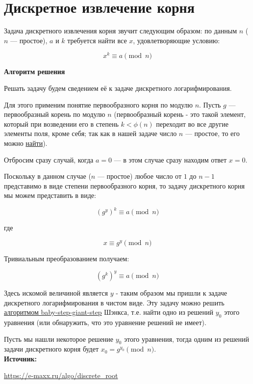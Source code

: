 \documentclass[12pt,a4paper]{scrartcl}
\begin{document}
	
\section{Дискретное извлечение корня}

Задача дискретного извлечения корня звучит следующим образом: по данным $n$ ($n$ — простое), $a$ и $k$ требуется найти все $x$, удовлетворяющие условию:

$$x^k \equiv a \pmod{n}$$

\textbf{Алгоритм решения}

Решать задачу будем сведением её к задаче дискретного логарифмирования.

Для этого применим понятие первообразного корня по модулю $n$. Пусть $g$ — первообразный корень по модулю $n$ (первообразный корень - это такой элемент, который при возведении его в степень $k < \phi(n)$ переходит во все другие элементы поля, кроме себя; так как в нашей задаче число $n$ — простое, то его можно \href{https://yatb.kksctf.ru/}{найти}).

Отбросим сразу случай, когда $a=0$ — в этом случае сразу находим ответ $x=0$.

Поскольку в данном случае ($n$ — простое) любое число от $1$ до $n-1$ представимо в виде степени первообразного корня, то задачу дискретного корня мы можем представить в виде:

$${\left( g^y \right)}^k \equiv a \pmod{n}$$

где

$$x \equiv g^y \pmod{n}$$

Тривиальным преобразованием получаем:

$${\left( g^k \right)}^y \equiv a \pmod{n}$$

Здесь искомой величиной является $y$ - таким образом мы пришли к задаче дискретного логарифмирования в чистом виде. Эту задачу можно решить \href{https://yatb.kksctf.ru/}{алгоритмом baby-step-giant-step} Шэнкса, т.е. найти одно из решений $y_0$ этого уравнения (или обнаружить, что это уравнение решений не имеет).

Пусть мы нашли некоторое решение $y_0$ этого уравнения, тогда одним из решений задачи дискретного корня будет $x_0 = g^{y_0} \pmod{n}$.\\

\textbf{Источник:}

\href{https://e-maxx.ru/algo/discrete_root}{https://e-maxx.ru/algo/discrete\_root}
	
\end{document}
